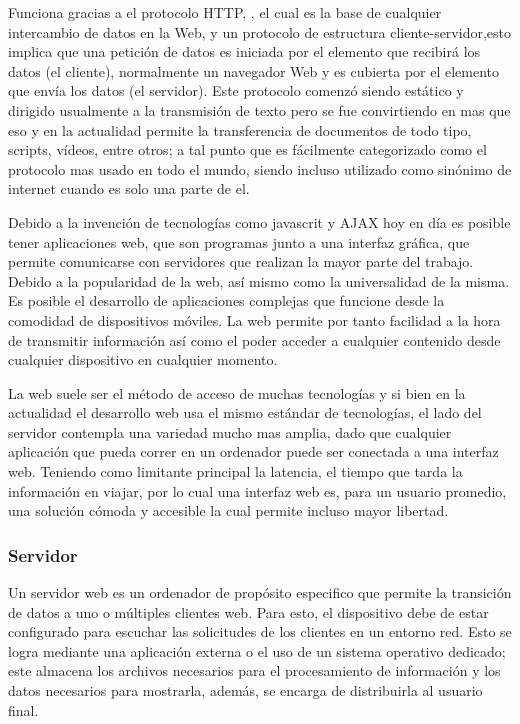 Funciona gracias a el protocolo HTTP, ,
el cual es la base de cualquier intercambio de datos en la Web, y un protocolo
de estructura cliente-servidor,esto implica que una petición de datos es
iniciada por el elemento que recibirá los datos (el cliente), normalmente un
navegador Web y es cubierta por el elemento que envía los datos (el servidor).
Este protocolo comenzó siendo estático y dirigido usualmente a la transmisión de
texto pero se fue convirtiendo en mas que eso y en la actualidad permite la
transferencia de documentos de todo tipo, scripts, vídeos, entre otros; a tal
punto que es fácilmente categorizado como el protocolo mas usado en todo el
mundo, siendo incluso utilizado como sinónimo de internet cuando es solo una
parte de el.

Debido a la invención de tecnologías como javascrit y AJAX hoy en día es
posible tener aplicaciones web, que son programas junto a una interfaz gráfica,
que permite comunicarse con servidores que realizan la mayor parte del trabajo.
Debido a la popularidad de la web, así mismo como la  universalidad de la
misma. Es posible el desarrollo de aplicaciones complejas que funcione desde la
comodidad de dispositivos móviles. La web permite por tanto facilidad a la hora
de transmitir información así como el poder acceder a cualquier contenido desde
cualquier dispositivo en cualquier momento.

La web suele ser el método de acceso de muchas tecnologías y si bien en la actualidad
el desarrollo web usa el mismo estándar de tecnologías, el lado del servidor
contempla una variedad mucho mas amplia, dado que cualquier aplicación que
pueda correr en un ordenador puede ser conectada a una interfaz web. Teniendo
como limitante principal la latencia, el tiempo que tarda la información en viajar,
por lo cual una interfaz web es, para un usuario promedio, una solución cómoda y
accesible la cual  permite incluso  mayor libertad.


\subsubsection*{Servidor}

Un servidor web es un ordenador de propósito especifico que permite la
transición de datos a uno o múltiples clientes web. Para esto, el dispositivo
debe de estar configurado para escuchar las solicitudes de los clientes en un
entorno red. Esto se logra mediante una aplicación externa o el uso de un
sistema operativo dedicado; este almacena los archivos
necesarios para el procesamiento de información y los datos necesarios para
mostrarla, además, se encarga de distribuirla al usuario final.


